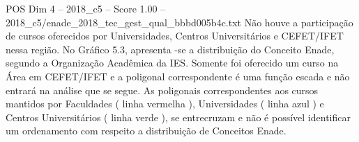 \begin{textsample}{POS Dim 4 – 2018\_c5 – Score 1.00 – 2018\_c5/enade\_2018\_tec\_gest\_qual\_bbbd005b4c.txt}
Não houve a participação de cursos oferecidos por Universidades, Centros Universitários e CEFET/IFET nessa região.
No Gráfico 5.3, apresenta -se a distribuição do Conceito Enade, segundo a Organização Acadêmica da IES.
Somente foi oferecido um curso na Área em CEFET/IFET e a poligonal correspondente é uma função escada e não entrará na análise que se segue.
As poligonais correspondentes aos cursos mantidos por Faculdades ( linha vermelha ), Universidades ( linha azul ) e Centros Universitários ( linha verde ), se entrecruzam e não é possível identificar um ordenamento com respeito a distribuição de Conceitos Enade.

\end{textsample}
